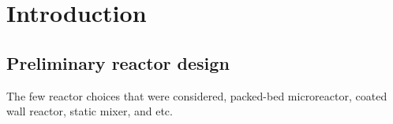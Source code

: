 \section{Introduction}
\subsection{Preliminary reactor design}
The few reactor choices that were considered, packed-bed microreactor, coated wall reactor, static mixer, and etc.


